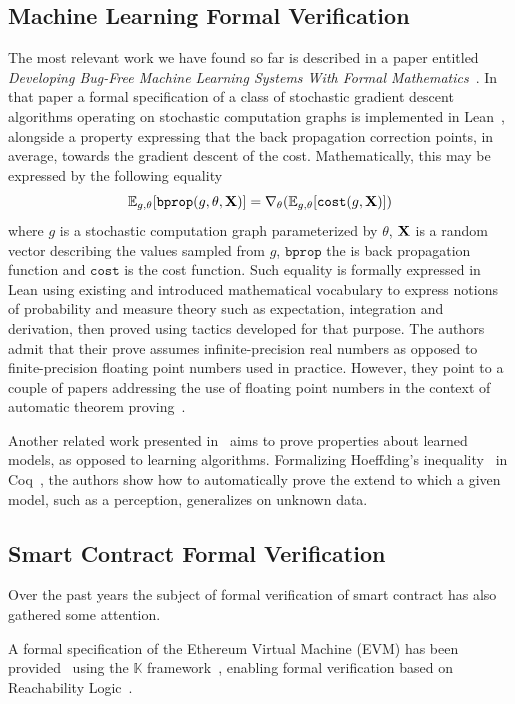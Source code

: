 \documentclass[]{report}
\begin{document}
\subsection{Machine Learning Formal Verification}

The most relevant work we have found so far is described in a paper
entitled \emph{Developing Bug-Free Machine Learning Systems With
  Formal Mathematics}~\cite{DBLP:journals/corr/SelsamLD17}.  In that
paper a formal specification of a class of stochastic gradient descent
algorithms operating on stochastic computation graphs is implemented
in Lean~\cite{Lean}, alongside a property expressing that the back
propagation correction points, in average, towards the gradient
descent of the cost.  Mathematically, this may be expressed by the
following equality
$$\mathbb{E}_{g,\theta}[\texttt{bprop}(g,\theta,\bold{X})] = \nabla_{\theta}(\mathbb{E}_{g,\theta}[\texttt{cost}(g,\bold{X})])$$
where $g$ is a stochastic computation graph parameterized by $\theta$,
$\bold{X}$ is a random vector describing the values sampled from $g$,
$\texttt{bprop}$ the is back propagation function and $\texttt{cost}$
is the cost function.  Such equality is formally expressed in Lean
using existing and introduced mathematical vocabulary to express
notions of probability and measure theory such as expectation,
integration and derivation, then proved using tactics developed for
that purpose.  The authors admit that their prove assumes
infinite-precision real numbers as opposed to finite-precision
floating point numbers used in practice.  However, they point to a
couple of papers addressing the use of floating point numbers in the
context of automatic theorem proving~\cite{Harrison2006,
  Ramananandro2016}.

Another related work presented in~\cite{Bagnall2019} aims to prove
properties about learned models, as opposed to learning algorithms.
Formalizing Hoeffding's inequality~\cite{Hoeffding1963} in
Coq~\cite{Bertot2004}, the authors show how to automatically prove the
extend to which a given model, such as a perception, generalizes on
unknown data.

\subsection{Smart Contract Formal Verification}

Over the past years the subject of formal verification of smart
contract has also gathered some attention.

A formal specification of the Ethereum Virtual Machine (EVM) has been
provided~\cite{Hildenbrandt2018} using the $\mathbb{K}$
framework~\cite{Xiaohong2019}, enabling formal verification based on
Reachability Logic~\cite{Alechina2000}.
\end{document}
